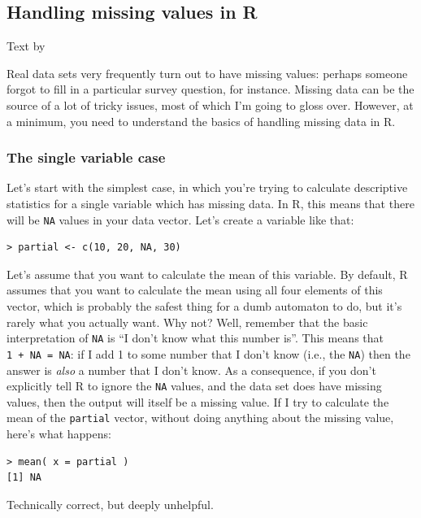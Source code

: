 \documentclass[
]{book}
\begin{document}
\hypertarget{missing}{%
\subsection{Handling missing values in R}\label{missing}}

Text by \citet{Navarro2018}

Real data sets very frequently turn out to have missing values: perhaps someone forgot to fill in a particular survey question, for instance. Missing data can be the source of a lot of tricky issues, most of which I'm going to gloss over. However, at a minimum, you need to understand the basics of handling missing data in R.

\hypertarget{the-single-variable-case}{%
\subsubsection{The single variable case}\label{the-single-variable-case}}

Let's start with the simplest case, in which you're trying to calculate descriptive statistics for a single variable which has missing data. In R, this means that there will be \texttt{NA} values in your data vector. Let's create a variable like that:

\begin{verbatim}
> partial <- c(10, 20, NA, 30)
\end{verbatim}

Let's assume that you want to calculate the mean of this variable. By default, R assumes that you want to calculate the mean using all four elements of this vector, which is probably the safest thing for a dumb automaton to do, but it's rarely what you actually want. Why not? Well, remember that the basic interpretation of \texttt{NA} is ``I don't know what this number is''. This means that \texttt{1\ +\ NA\ =\ NA}: if I add 1 to some number that I don't know (i.e., the \texttt{NA}) then the answer is \emph{also} a number that I don't know. As a consequence, if you don't explicitly tell R to ignore the \texttt{NA} values, and the data set does have missing values, then the output will itself be a missing value. If I try to calculate the mean of the \texttt{partial} vector, without doing anything about the missing value, here's what happens:

\begin{verbatim}
> mean( x = partial )
[1] NA
\end{verbatim}

Technically correct, but deeply unhelpful.
\end{document}
